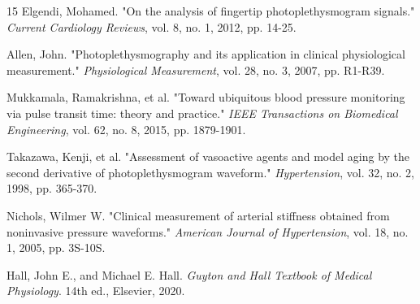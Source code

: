 \documentclass[fleqn,10pt,twocolumn]{AROB}
\begin{document}
\begin{thebibliography}{15}
Elgendi, Mohamed. "On the analysis of fingertip photoplethysmogram signals." \textit{Current Cardiology Reviews}, vol. 8, no. 1, 2012, pp. 14-25.

Allen, John. "Photoplethysmography and its application in clinical physiological measurement." \textit{Physiological Measurement}, vol. 28, no. 3, 2007, pp. R1-R39.

Mukkamala, Ramakrishna, et al. "Toward ubiquitous blood pressure monitoring via pulse transit time: theory and practice." \textit{IEEE Transactions on Biomedical Engineering}, vol. 62, no. 8, 2015, pp. 1879-1901.

Takazawa, Kenji, et al. "Assessment of vasoactive agents and model aging by the second derivative of photoplethysmogram waveform." \textit{Hypertension}, vol. 32, no. 2, 1998, pp. 365-370.

Nichols, Wilmer W. "Clinical measurement of arterial stiffness obtained from noninvasive pressure waveforms." \textit{American Journal of Hypertension}, vol. 18, no. 1, 2005, pp. 3S-10S.

Hall, John E., and Michael E. Hall. \textit{Guyton and Hall Textbook of Medical Physiology}. 14th ed., Elsevier, 2020.
\end{thebibliography}
\end{document}
